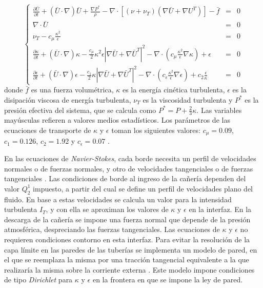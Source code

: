 \begin{equation}
\left\{ \begin{array}{rcl}
\displaystyle \frac{\partial \bar{U} }{\partial t} + ( \bar{U} \cdot \nabla) \bar{U} + \frac {\nabla P^*}{\rho} - 
\nabla \cdot \left[ \left( \nu + \nu_T \right) \left( \nabla \bar{U} + \nabla U^T \right) \right] -\bar{f} &=& 0 \\
\nabla \cdot \bar{U} &=& 0 \\
\displaystyle \nu_T -c_\mu \frac{\kappa^2}{\epsilon} &=& 0\\
\displaystyle \frac{\partial \kappa}{\partial t} + ( \bar{U} \cdot \nabla) \kappa - \frac{c_\mu} {2}{\kappa^2}{\epsilon} \left | \nabla \bar{U} + \nabla\bar{U}^T \right | ^2  
- \nabla \cdot \left( c_\mu \frac{\kappa^2}{\epsilon} \nabla \kappa \right) + \epsilon &=& 0 \\
\displaystyle \frac{\partial {\epsilon}}{\partial t} + ( \bar{U} \cdot \nabla) \epsilon - \frac{c_1} {2} \kappa \left | \nabla \bar{U} + \nabla \bar{U}^T \right | ^2
- \nabla \cdot \left( c_{\epsilon} \frac{\kappa^2}{\epsilon} \nabla \epsilon \right) + c_2 \frac{\epsilon}{\kappa} &=& 0
\label{eq-mani}
\end{array} \right.
\end{equation}
donde $\bar{f}$ es una fuerza volumétrica, 
$\kappa$ es la energía cinética turbulenta, $\epsilon$ es la disipación viscosa de energía turbulenta,
$\nu_T$ es la viscosidad turbulenta y $P^*$ es la presión efectiva del sistema, que se calcula como
$\displaystyle P^* = P + \frac {2}{3}\kappa$.
Las variables mayúsculas refieren a valores medios estadísticos.
Los parámetros de las ecuaciones de transporte de $\kappa$ y $\epsilon$ toman los siguientes valores:
$c_\mu=0.09$, $c_1=0.126$, $c_2=1.92$ y $c_\epsilon=0.07$ \cite{durbin}.

En las ecuaciones de \textit{Navier-Stokes}, cada borde necesita un perfil de velocidades normales o de fuerzas normales,
y otro de velocidades tangenciales o de fuerzas tangenciales \cite{gunzburger}.
Las condiciones de borde al ingreso de la cañería dependen del valor $Q_2^1$ impuesto,
a partir del cual se define un perfil de velocidades plano del fluido.
En base a estas velocidades se calcula un valor para la intensidad turbulenta $I_T$,
y con ella se aproximan los valores de $\kappa$ y $\epsilon$ en la interfaz.
En la descarga de la cañería se impone una fuerza normal que depende de la presión atmosférica,
despreciando las fuerzas tangenciales.
Las ecuaciones de $\kappa$ y $\epsilon$ no requieren condiciones contorno en esta interfaz.
Para evitar la resolución de la capa límite en las paredes de las tuberías se implementa un modelo de pared,
en el que se reemplaza la misma por una tracción tangencial equivalente a la que realizaría la misma sobre la corriente externa
\cite{k-e}.
Este modelo impone condiciones de tipo \textit{Dirichlet} para $\kappa$ y $\epsilon$ en la frontera en que se impone la ley de pared.

